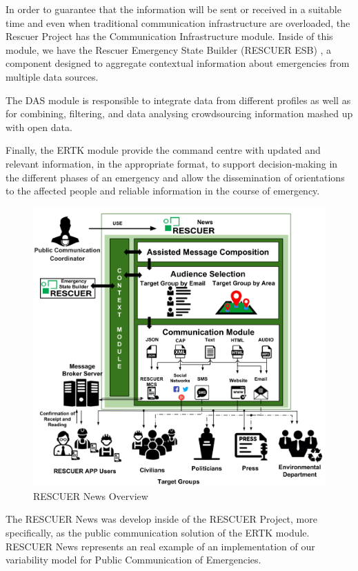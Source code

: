 In order to guarantee that the information will be sent or received in a suitable time and even when traditional communication infrastructure are overloaded, the Rescuer Project has the Communication Infrastructure module. Inside of this module, we have the Rescuer Emergency State Builder (RESCUER ESB) \citep{pereiraetall2017}, a component designed to aggregate contextual information about emergencies from multiple data sources.

The DAS module is responsible to integrate data from different profiles as well as for combining, filtering, and data analysing \citep{chino2015bowfire} crowdsourcing information mashed up with open data. 

Finally, the ERTK module provide the command centre with updated and relevant information, in the appropriate format, to support decision-making in the different phases of an emergency and allow the dissemination of orientations to the affected people and reliable information in the course of emergency.


\begin{figure}
\centering
\includegraphics[width=0.75\linewidth]{images/RescuerNewsConcept}
\caption{RESCUER News Overview}
\label{fig:rescuerOverview}
\end{figure} 

The RESCUER News was develop inside of the RESCUER Project, more specifically, as the public communication solution of the ERTK module. RESCUER News represents an real example of an implementation of our variability model for Public Communication of Emergencies.   

